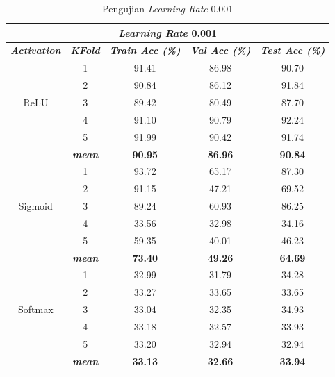     \begin{table}[H]
        \centering
        \caption{Pengujian \textit{Learning Rate} 0.001 }
        \begin{tabular}{ccccc}
            \toprule
            \multicolumn{5}{c}{\textit{Learning Rate} 0.001} \\ \hline
            
            \textbf{\textit{Activation}} & \multicolumn{1}{c}{\textbf{\textit{KFold}}} & \textbf{\textit{Train Acc (\%)} } & \textbf{\textit{Val Acc (\%)}} & \textbf{\textit{Test Acc (\%)}}  \\
    
            \midrule
            \multirow{5}{*}{ReLU} 
            & 1 & 91.41 & 86.98 & 90.70  \\
            & 2 & 90.84 & 86.12 & 91.84 \\
            & 3 & 89.42 & 80.49 & 87.70 \\
            & 4 & 91.10 & 90.79 & 92.24 \\
            & 5 & 91.99 & 90.42 & 91.74  \\
            & \textit{\textbf{mean}}& \textbf{90.95} & \textbf{86.96} &\textbf{ 90.84} \\ \hline
    
            \multirow{5}{*}{Sigmoid}
            & 1 &  93.72 & 65.17 & 87.30  \\
            & 2 &  91.15 & 47.21 & 69.52 \\
            & 3 &  89.24 & 60.93 & 86.25 \\
            & 4 &  33.56 & 32.98 & 34.16 \\
            & 5 &  59.35 & 40.01 & 46.23 \\
            & \textit{\textbf{mean}}& \textbf{73.40} & \textbf{49.26} &\textbf{64.69} \\ 
                        \hline
    
            \multirow{5}{*}{Softmax}
            & 1 & 32.99 & 31.79 & 34.28 \\
            & 2 & 33.27 & 33.65 & 33.65 \\
            & 3 & 33.04 & 32.35 & 34.93  \\
            & 4 & 33.18 & 32.57 & 33.93 \\
            & 5 & 33.20 & 32.94 & 32.94 \\
            & \textit{\textbf{mean}}& \textbf{33.13} & \textbf{32.66} &\textbf{33.94} \\ 

            \bottomrule
        \end{tabular}
        \label{Pengujian Learning Rate 0.001}
    \end{table}

